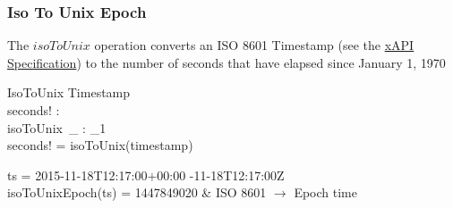\documentclass[../../main.tex]{subfiles}
\begin{document}
\subsubsection{Iso To Unix Epoch}
The $isoToUnix$ operation converts an ISO 8601 Timestamp (see the \href{https://github.com/adlnet/xAPI-Spec/blob/master/xAPI-Data.md#timestamps}{xAPI Specification})
to the number of seconds that have elapsed since January 1, 1970
\begin{schema}{IsoToUnix}
  Timestamp \\
  seconds! : \nat \\
  isoToUnix~\_ : \finset_1 \fun \nat \\
  \where
  seconds! = isoToUnix(timestamp)
\end{schema}
\begin{argue}
  ts = 2015-11-18T12:17:00+00:00 -11-18T12:17:00Z \\
  isoToUnixEpoch(ts) =  1447849020 & ISO 8601 $\to$ Epoch time
\end{argue}
\end{document}

